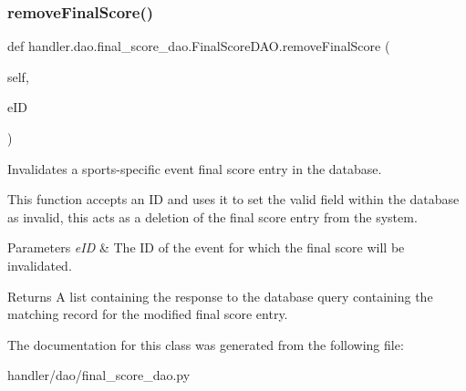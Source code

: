 \subsubsection{\texorpdfstring{remove\+Final\+Score()}{removeFinalScore()}}
{\footnotesize\ttfamily def handler.\+dao.\+final\+\_\+score\+\_\+dao.\+Final\+Score\+D\+A\+O.\+remove\+Final\+Score (\begin{DoxyParamCaption}\item[{}]{self,  }\item[{}]{e\+ID }\end{DoxyParamCaption})}



Invalidates a sports-\/specific event final score entry in the database. 

This function accepts an ID and uses it to set the valid field within the database as invalid, this acts as a deletion of the final score entry from the system.


\begin{DoxyParams}{Parameters}
{\em e\+ID} & The ID of the event for which the final score will be invalidated.\\
\hline
\end{DoxyParams}
\begin{DoxyReturn}{Returns}
A list containing the response to the database query containing the matching record for the modified final score entry. 
\end{DoxyReturn}


The documentation for this class was generated from the following file\+:\begin{DoxyCompactItemize}
\item 
handler/dao/final\+\_\+score\+\_\+dao.\+py\end{DoxyCompactItemize}

